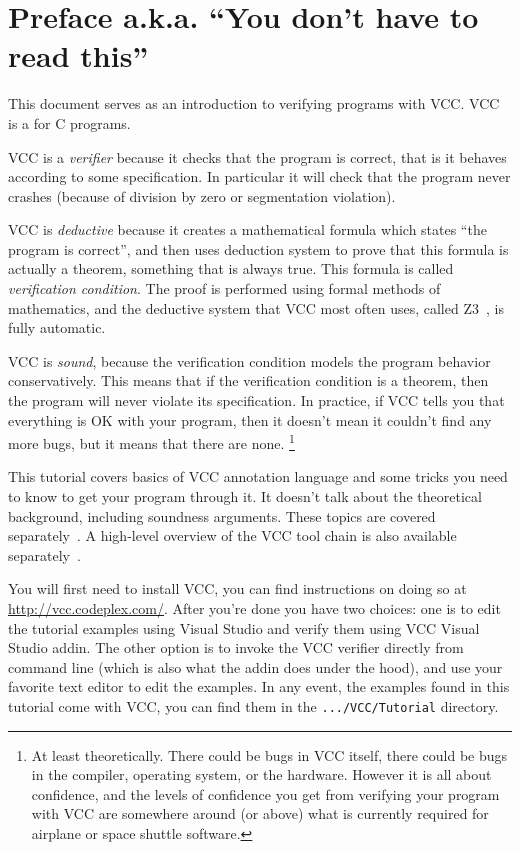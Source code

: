 \section{Preface a.k.a. ``You don't have to read this''}

This document serves as an introduction to verifying programs with VCC.
VCC is a  for C programs.

VCC is a \emph{verifier} because it checks that the program is correct, that is it behaves according to
some specification.
In particular it will check that the program never crashes (because of division
by zero or segmentation violation).

VCC is \emph{deductive} because it creates a mathematical formula which
states ``the program is correct'', and then uses deduction system
to prove that this formula is actually a theorem, something that is always true.
This formula is called \emph{verification condition}.
The proof is performed using formal methods of mathematics,
and the deductive system that VCC most often uses, called Z3~\cite{z3},
is fully automatic.

VCC is \emph{sound}, because the verification condition models the program behavior conservatively.
This means that if the verification condition is a theorem, then the program will never
violate its specification.
In practice, if VCC tells you that everything is OK with your program,
then it doesn't mean it couldn't find any more bugs, but it means that there are none.%
\footnote{
  At least theoretically.
  There could be bugs in VCC itself, there could be bugs in the compiler, operating system, or the hardware.
  However it is all about confidence, and the levels of confidence you get from verifying your program with
  VCC are somewhere around (or above) what is currently required for airplane or space shuttle software.
}

This tutorial covers basics of VCC annotation language and some tricks you
need to know to get your program through it. 
It doesn't talk about the theoretical background, including soundness
arguments.
These topics are covered separately~\cite{lci}.
A high-level overview
of the VCC tool chain is also available separately~\cite{Cohen:TPHOLs2009-23}.

You will first need to install VCC, you can find instructions on doing so at \url{http://vcc.codeplex.com/}.
After you're done you have two choices: one is to edit the tutorial examples
using Visual Studio and verify them using VCC Visual Studio addin.
The other option is to invoke the VCC verifier directly from command line
(which is also what the addin does under the hood),
and use your favorite text editor to edit the examples.
In any event, the examples found in this tutorial come with VCC, you
can find them in the \texttt{.../VCC/Tutorial} directory.
